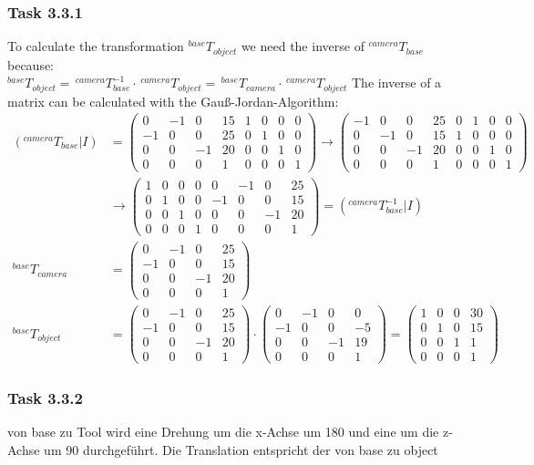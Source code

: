 \subsubsection*{Task 3.3.1}
To calculate the transformation $^{base}T_{object}$ we need the inverse of $^{camera}T_{base}$ because:\\
$^{base}T_{object} =\,^{camera}T_{base}^{-1} \cdot\,^{camera}T_{object} =\,^{base}T_{camera} \cdot\,^{camera}T_{object}$
The inverse of a matrix can be calculated with the Gauß-Jordan-Algorithm:
\begin{align*}
(^{camera}T_{base}|I) &= 
\left(
\begin{array}{cccc|cccc}
0 & -1 & 0 & 15 & 1 & 0 & 0 & 0\\
-1 & 0 & 0 & 25 & 0 & 1 & 0 & 0\\
0 & 0 & -1 & 20 & 0 & 0 & 1 & 0\\
0 & 0 & 0  & 1   & 0 & 0 & 0 & 1
\end{array}
\right)
\rightarrow 
\left(
\begin{array}{cccc|cccc}
-1 & 0 & 0 & 25 & 0 & 1 & 0 & 0\\
0 & -1 & 0 & 15 & 1 & 0 & 0 & 0\\
0 & 0 & -1 & 20 & 0 & 0 & 1 & 0\\
0 & 0 & 0  & 1   & 0 & 0 & 0 & 1
\end{array}
\right)\\
&\rightarrow 
\left(
\begin{array}{cccc|cccc}
1 & 0 & 0 & 0 & 0 & -1 & 0 & 25\\
0 & 1 & 0 & 0 & -1 & 0 & 0 & 15\\
0 & 0 & 1 & 0 & 0 & 0 & -1 & 20\\
0 & 0 & 0  & 1 & 0 & 0 & 0 & 1
\end{array}
\right)
=(^{camera}T_{base}^{-1}|I) 
\\
^{base}T_{camera} &=
\begin{pmatrix}
0 & -1 & 0 & 25\\
-1 & 0 & 0 & 15\\
0 & 0 & -1 & 20\\
0 & 0 & 0 & 1
\end{pmatrix}
\\
^{base}T_{object} &=
\begin{pmatrix}
0 & -1 & 0 & 25\\
-1 & 0 & 0 & 15\\
0 & 0 & -1 & 20\\
0 & 0 & 0 & 1
\end{pmatrix}
\cdot
\begin{pmatrix}
0 & -1 & 0 & 0\\
-1 & 0 & 0 & -5\\
0 & 0 & -1 & 19\\
0 & 0 & 0 & 1
\end{pmatrix}
=
\begin{pmatrix}
1 & 0 & 0 & 30\\
0 & 1 & 0 & 15\\
0 & 0 & 1 & 1\\
0 & 0 & 0 & 1
\end{pmatrix}
\end{align*}

\subsubsection*{Task 3.3.2}
von base zu Tool wird eine Drehung um die x-Achse um 180 und eine um die z-Achse um 90 durchgeführt. Die Translation entspricht der von base zu object
